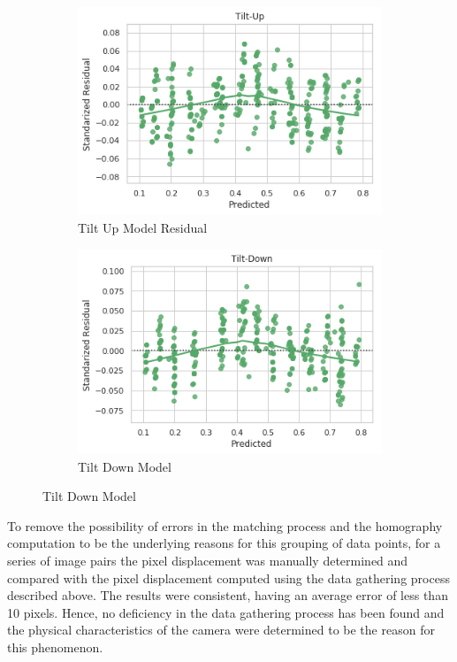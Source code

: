 \documentclass{l4proj}
\begin{document}
\begin{figure}[H]
\begin{subfigure}[b]{0.5\textwidth}
    \includegraphics[width=\textwidth]{l4template-master/images/tilt_up_residual.png}
    \caption{Tilt Up Model Residual}
    \label{tiltupres}
  \end{subfigure}
  \begin{subfigure}[b]{0.5\textwidth}
    \includegraphics[width=\textwidth]{l4template-master/images/tilt_down_residual.png}
    \caption{Tilt Down Model}
    \label{tiltdownres}
  \end{subfigure}  
    
\end{figure}


To remove the possibility of errors in the matching process and the homography computation to be the underlying reasons for this grouping of data points, for a series of image pairs the pixel displacement was manually determined and compared with the pixel displacement computed using the data gathering process described above. The results were consistent, having an average error of less than 10 pixels. Hence, no deficiency in the data gathering process has been found and the physical characteristics of the camera were determined to be the reason for this phenomenon. 
\end{document}
